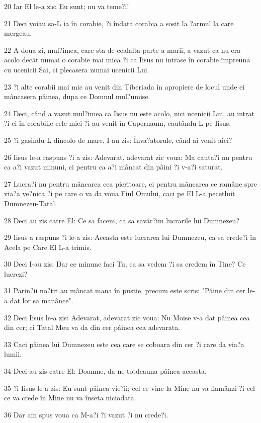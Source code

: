 \par 20 Iar El le-a zis: Eu sunt; nu va teme?i!
\par 21 Deci voiau sa-L ia în corabie, ?i îndata corabia a sosit la ?armul la care mergeau.
\par 22 A doua zi, mul?imea, care sta de cealalta parte a marii, a vazut ca nu era acolo decât numai o corabie mai mica ?i ca Iisus nu intrase în corabie împreuna cu ucenicii Sai, ci plecasera numai ucenicii Lui.
\par 23 ?i alte corabii mai mic au venit din Tiberiada în apropiere de locul unde ei mâncasera pâinea, dupa ce Domnul mul?umise.
\par 24 Deci, când a vazut mul?imea ca Iisus nu este acolo, nici ucenicii Lui, au intrat ?i ei în corabiile cele mici ?i au venit în Capernaum, cautându-L pe Iisus.
\par 25 ?i gasindu-L dincolo de mare, I-au zis: Înva?atorule, când ai venit aici?
\par 26 Iisus le-a raspuns ?i a zis: Adevarat, adevarat zic voua: Ma cauta?i nu pentru ca a?i vazut minuni, ci pentru ca a?i mâncat din pâini ?i v-a?i saturat.
\par 27 Lucra?i nu pentru mâncarea cea pieritoare, ci pentru mâncarea ce ramâne spre via?a ve?nica ?i pe care o va da voua Fiul Omului, caci pe El L-a pecetluit Dumnezeu-Tatal.
\par 28 Deci au zis catre El: Ce sa facem, ca sa savâr?im lucrarile lui Dumnezeu?
\par 29 Iisus a raspuns ?i le-a zis: Aceasta este lucrarea lui Dumnezeu, ca sa crede?i în Acela pe Care El L-a trimis.
\par 30 Deci I-au zis: Dar ce minune faci Tu, ca sa vedem ?i sa credem în Tine? Ce lucrezi?
\par 31 Parin?ii no?tri au mâncat mana în pustie, precum este scris: "Pâine din cer le-a dat lor sa manânce".
\par 32 Deci Iisus le-a zis: Adevarat, adevarat zic voua: Nu Moise v-a dat pâinea cea din cer; ci Tatal Meu va da din cer pâinea cea adevarata.
\par 33 Caci pâinea lui Dumnezeu este cea care se coboara din cer ?i care da via?a lumii.
\par 34 Deci au zis catre El: Doamne, da-ne totdeauna pâinea aceasta.
\par 35 ?i Iisus le-a zis: Eu sunt pâinea vie?ii; cel ce vine la Mine nu va flamânzi ?i cel ce va crede în Mine nu va înseta niciodata.
\par 36 Dar am spus voua ca M-a?i ?i vazut ?i nu crede?i.
